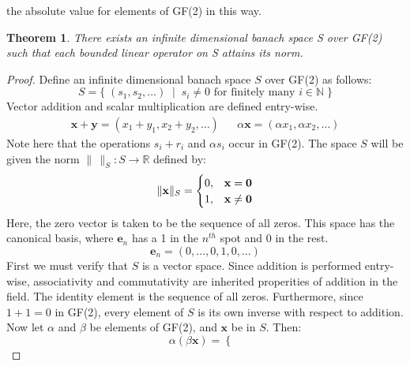 \documentclass{article}
\theoremstyle{plain}
\newtheorem*{theorem*}{Theorem}
\DeclarePairedDelimiter\norm{\lVert}{\rVert}
\begin{document}
    the absolute value for elements of GF(2) in this way.
    \begin{theorem*}
        There exists an infinite dimensional banach space S over GF(2)
        such that each bounded linear operator on S attains its norm.
    \end{theorem*}
    \begin{proof}
        Define an infinite dimensional banach space $S$ over GF(2) as follows:
        \begin{equation}
            S=\{\;(s_{1},s_{2},\dots )\;\;|\;\;s_{i}\neq0
                \text{ for finitely many }i\in\mathbb{N}\;\} 
        \end{equation}
        Vector addition and scalar multiplication are defined entry-wise.
        \begin{align}
            \mathbf{x}+\mathbf{y}=(x_{1}+y_{1},x_{2}+y_{2},\dots)
            &&\alpha\mathbf{x}=(\alpha{x}_{1},\alpha{x}_{2},\dots)
        \end{align}
        Note here that the operations $s_i+r_i$ and $\alpha s_i$ occur
        in GF(2). The space $S$ will be given the norm
        $\|\,\|_{S}:S\rightarrow\mathbb{R}$ defined by:
        \begin{align}
            \norm{\mathbf{x}}_{S}=
            \begin{cases}
                0,&\mathbf{x}=\mathbf{0}\\
                1,&\mathbf{x}\neq\mathbf{0}
            \end{cases}
        \end{align}
        Here, the zero vector is taken to be the sequence of all zeros.
        This space has the canonical basis, where $\mathbf{e}_{n}$ has a
        1 in the $n^{th}$ spot and 0 in the rest.
        \begin{equation}
            \mathbf{e}_n=(0,\dots,0,1,0,\dots )
        \end{equation}
        First we must verify that $S$ is a vector space. Since addition is performed
        entry-wise, associativity and commutativity are inherited properities of
        addition in the field. The identity element is the sequence of all zeros.
        Furthermore, since $1+1=0$ in GF(2), every element of $S$ is its own inverse
        with respect to addition. Now let $\alpha$ and $\beta$ be elements of GF(2),
        and $\mathbf{x}$ be in $S$. Then:
        \begin{equation}
            \alpha(\beta\mathbf{x})=
                \begin{cases}

\end{cases}
\end{equation}
\end{proof}
\end{document}
